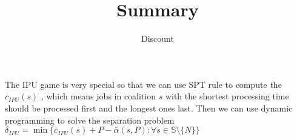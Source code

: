 \documentclass[UTF8]{article}
\title{Summary}
\author{Dis\cdot count}
\begin{document}
\maketitle{}








%









The IPU game is very special so that we can use SPT rule to compute the $c_{IPU}(s)$ , which means jobs in coalition $s$ with the shortest processing time should be processed first and the longest ones last. Then we can use dynamic programming to solve the separation problem $\delta_{IPU} = \min \big\{c_{IPU}(s)+P-\bar{\alpha}(s,P): \forall s \in \mathbb{S} \setminus \{N\}\big\} $
\end{document}
